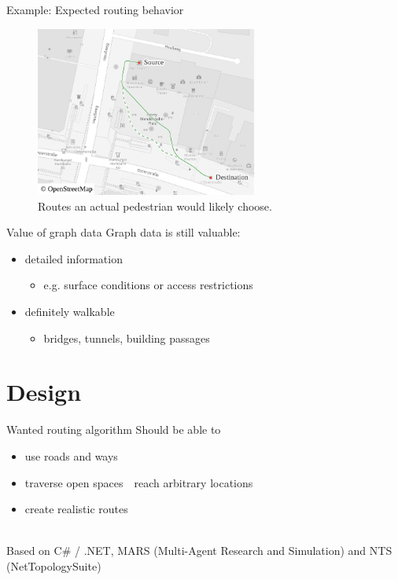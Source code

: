 \documentclass[xcolor={x11names}]{beamer}
\renewcommand{\n}{\hfill\\[0.5ex]}
\newcommand{\nn}{\hfill\\[2ex]}
\newenvironment{figcenter}
{%
	\parskip=0pt%
	\par%
	\nopagebreak%
	\centering%
}%
{%
	\par%
	\noindent%
	\ignorespacesafterend%
}
\begin{document}
		\begin{frame}{Example: Expected routing behavior}
			\begin{figure}[t]
				\begin{figcenter}
					\includegraphics[width=0.65\textwidth]{images/qgis-routing-osterstrasse_expected.pdf}
				\end{figcenter}
				\caption{Routes an actual pedestrian would likely choose.}
			\end{figure}
		\end{frame}
		
		\begin{frame}{Value of graph data}
			Graph data is still valuable:\n
			\begin{itemize}
				\item detailed information
				\begin{itemize}
					\item e.g. surface conditions or access restrictions
				\end{itemize}
				\item definitely walkable
				\begin{itemize}
					\item bridges, tunnels, building passages
				\end{itemize}
			\end{itemize}
		\end{frame}
	
	\section{Design}
	
		\begin{frame}{Wanted routing algorithm}
			Should be able to\n
			\begin{itemize}
				\item use roads and ways
				\item traverse open spaces\ \textrightarrow\ reach arbitrary locations
				\item create realistic routes
			\end{itemize}
			\nn
			\pause
			Based on C\# / .NET, MARS (Multi-Agent Research and Simulation) and NTS (NetTopologySuite)
		\end{frame}
		
\end{document}
